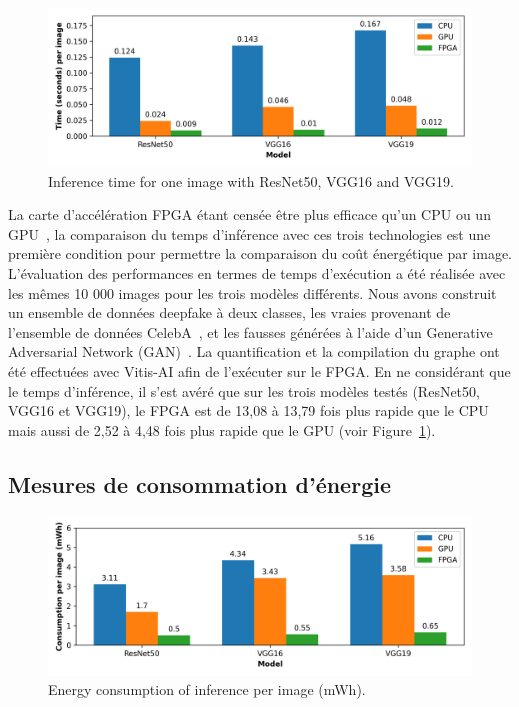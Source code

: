 \begin{figure}[t]
\centering
\includegraphics[width=\columnwidth]{5_Chapitre3/figures/characterization/time_of_inference_1_image.png}
\caption{Inference time for one image with ResNet50, VGG16 and VGG19.}
\label{figure:herofake-time-inference}
\end{figure}

La carte d'accélération FPGA étant censée être plus efficace qu'un CPU ou un GPU~\cite{5272532}, la comparaison du temps d'inférence avec ces trois technologies est une première condition pour permettre la comparaison du coût énergétique par image. L'évaluation des performances en termes de temps d'exécution a été réalisée avec les mêmes 10 000 images pour les trois modèles différents. Nous avons construit un ensemble de données deepfake à deux classes, les vraies provenant de l'ensemble de données CelebA~\cite{https://doi.org/10.48550/arxiv.1411.7766}, et les fausses générées à l'aide d'un Generative Adversarial Network (GAN)~\cite{jimaging7080128}. La quantification et la compilation du graphe ont été effectuées avec Vitis-AI afin de l'exécuter sur le FPGA. En ne considérant que le temps d'inférence, il s'est avéré que sur les trois modèles testés (ResNet50, VGG16 et VGG19), le FPGA est de 13,08 à 13,79 fois plus rapide que le CPU mais aussi de 2,52 à 4,48 fois plus rapide que le GPU (voir Figure~\ref{figure:herofake-time-inference}).

\subsection{Mesures de consommation d'énergie}

\begin{figure}[t]
\centering
\includegraphics[width=\columnwidth]{5_Chapitre3/figures/characterization/consumption_per_image.png}
\caption{Energy consumption of inference per image (mWh).}
\label{figure:herofake-consumption-per-image}
\end{figure}

